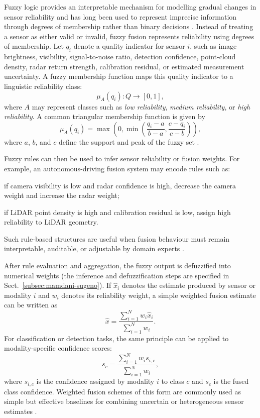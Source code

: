 Fuzzy logic provides an interpretable mechanism for modelling gradual changes in sensor reliability and has long been used to represent imprecise information through degrees of membership rather than binary decisions \cite{zadeh_fuzzy_1965}. Instead of treating a sensor as either valid or invalid, fuzzy fusion represents reliability using degrees of membership. Let $q_i$ denote a quality indicator for sensor $i$, such as image brightness, visibility, signal-to-noise ratio, detection confidence, point-cloud density, radar return strength, calibration residual, or estimated measurement uncertainty. A fuzzy membership function maps this quality indicator to a linguistic reliability class:
\begin{equation}
    \mu_A(q_i): Q \rightarrow [0,1],
\end{equation}
where $A$ may represent classes such as \emph{low reliability}, \emph{medium reliability}, or \emph{high reliability}. A common triangular membership function is given by
\begin{equation}
    \mu_A(q_i) =
    \max\left(0,
    \min\left(
    \frac{q_i-a}{b-a},
    \frac{c-q_i}{c-b}
    \right)\right),
\end{equation}
where $a$, $b$, and $c$ define the support and peak of the fuzzy set \cite{zadeh_fuzzy_1965}.

Fuzzy rules can then be used to infer sensor reliability or fusion weights. For example, an autonomous-driving fusion system may encode rules such as:
\begin{list4a}
    \item if camera visibility is low and radar confidence is high, decrease the camera weight and increase the radar weight;
    \item if LiDAR point density is high and calibration residual is low, assign high reliability to LiDAR geometry.
\end{list4a}
 Such rule-based structures are useful when fusion behaviour must remain interpretable, auditable, or adjustable by domain experts \cite{zadeh_fuzzy_1965, khaleghi_multisensor_2013}.

After rule evaluation and aggregation, the fuzzy output is defuzzified into numerical weights (the inference and defuzzification steps are specified in Sect.~\ref{subsec:mamdani-sugeno}). If $\hat{x}_i$ denotes the estimate produced by sensor or modality $i$ and $w_i$ denotes its reliability weight, a simple weighted fusion estimate can be written as
\begin{equation}
    \hat{x} =
    \frac{\sum_{i=1}^{N} w_i \hat{x}_i}
    {\sum_{i=1}^{N} w_i}.
\end{equation}
For classification or detection tasks, the same principle can be applied to modality-specific confidence scores:
\begin{equation}
    s_c =
    \frac{\sum_{i=1}^{N} w_i s_{i,c}}
    {\sum_{i=1}^{N} w_i},
\end{equation}
where $s_{i,c}$ is the confidence assigned by modality $i$ to class $c$ and $s_c$ is the fused class confidence. Weighted fusion schemes of this form are commonly used as simple but effective baselines for combining uncertain or heterogeneous sensor estimates \cite{hall_introduction_1997, khaleghi_multisensor_2013}.


